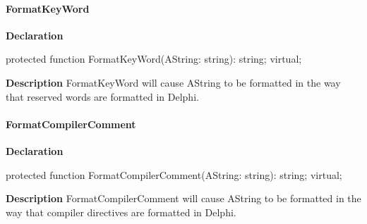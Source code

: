 \documentclass{report}
\newif\ifpdf
\begin{document}
\paragraph*{FormatKeyWord}\hspace*{\fill}

\label{PasDoc_Gen.TDocGenerator-FormatKeyWord}
\begin{list}{}{
\setlength{\itemindent}{0cm}
\setlength{\listparindent}{0cm}
\setlength{\leftmargin}{\evensidemargin}
\addtolength{\leftmargin}{\tmplength}
\settowidth{\labelsep}{X}
\addtolength{\leftmargin}{\labelsep}
\setlength{\labelwidth}{\tmplength}
}
\item[\textbf{Declaration}\hfill]
\ifpdf
\begin{flushleft}
\fi
\begin{ttfamily}
protected function FormatKeyWord(AString: string): string; virtual;\end{ttfamily}

\ifpdf
\end{flushleft}
\fi

\par
\item[\textbf{Description}]
FormatKeyWord will cause AString to be formatted in the way that reserved words are formatted in Delphi.

\end{list}
\paragraph*{FormatCompilerComment}\hspace*{\fill}

\label{PasDoc_Gen.TDocGenerator-FormatCompilerComment}
\begin{list}{}{
\setlength{\itemindent}{0cm}
\setlength{\listparindent}{0cm}
\setlength{\leftmargin}{\evensidemargin}
\addtolength{\leftmargin}{\tmplength}
\settowidth{\labelsep}{X}
\addtolength{\leftmargin}{\labelsep}
\setlength{\labelwidth}{\tmplength}
}
\item[\textbf{Declaration}\hfill]
\ifpdf
\begin{flushleft}
\fi
\begin{ttfamily}
protected function FormatCompilerComment(AString: string): string; virtual;\end{ttfamily}

\ifpdf
\end{flushleft}
\fi

\par
\item[\textbf{Description}]
FormatCompilerComment will cause AString to be formatted in the way that compiler directives are formatted in Delphi.

\end{list}
\end{document}
